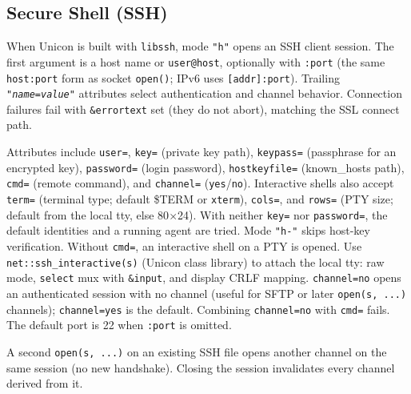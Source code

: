 \subsection*{Secure Shell (SSH)}

When Unicon is built with \texttt{libssh}, mode \texttt{"h"} opens an
SSH client session. The first argument is a host name or
\texttt{user@host}, optionally with \texttt{:port} (the same
\texttt{host:port} form as socket \texttt{open()}; IPv6 uses
\texttt{[addr]:port}). Trailing
\texttt{"\textit{name}=\textit{value}"} attributes select authentication
and channel behavior. Connection failures fail with \texttt{\&errortext}
set (they do not abort), matching the SSL connect path.


Attributes include \texttt{user=},
\texttt{key=} (private key path), \texttt{keypass=} (passphrase for an
encrypted key), \texttt{password=} (login password),
\texttt{hostkeyfile=} (known\_hosts path), \texttt{cmd=} (remote
command), and \texttt{channel=} (\texttt{yes}/\texttt{no}). Interactive
shells also accept \texttt{term=} (terminal type; default \$TERM or
\texttt{xterm}), \texttt{cols=}, and \texttt{rows=} (PTY size; default
from the local tty, else 80$\times$24). With neither
\texttt{key=} nor \texttt{password=}, the default identities and a
running agent are tried. Mode \texttt{"h-"} skips host-key verification.
Without \texttt{cmd=}, an interactive shell on a PTY is opened.
Use \texttt{net::ssh\_interactive(s)} (Unicon class library) to attach
the local tty: raw mode, \texttt{select} mux with \texttt{\&input}, and
display CRLF mapping. \texttt{channel=no} opens an authenticated session with no channel
(useful for SFTP or later \texttt{open(s, ...)} channels);
\texttt{channel=yes} is the default. Combining \texttt{channel=no} with
\texttt{cmd=} fails. The default port is 22 when \texttt{:port} is
omitted.

A second \texttt{open(s, ...)} on an existing SSH file opens another
channel on the same session (no new handshake). Closing the session
invalidates every channel derived from it.

